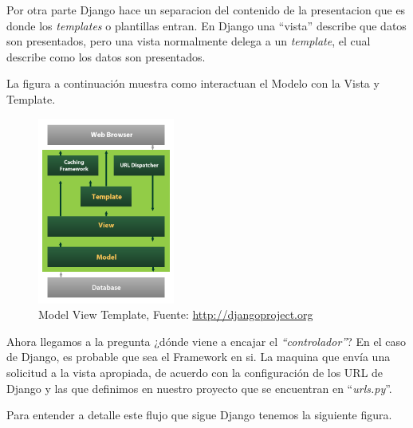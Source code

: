 Por otra parte Django hace un separacion del contenido de la presentacion que es
donde los {\it templates} o plantillas entran. En Django una ``vista'' describe
que datos son presentados, pero una vista normalmente delega a un {\it template},
el cual describe como los datos son presentados.

La figura a continuación muestra como interactuan el Modelo con la Vista y Template.

\begin{figure}[h]
  \begin{center}
    \includegraphics[width=0.4\textwidth]{figures/chapter5/Django_mvc.png}
    \caption[Model Template View - MTV]{Model View Template, Fuente: \url{http://djangoproject.org}}
  \end{center}
\end{figure}

Ahora llegamos a la pregunta ¿dónde viene a encajar el {\it ``controlador''}? En el caso
de Django, es probable que sea el Framework en si. La maquina que envía una
solicitud a la vista apropiada, de acuerdo con la configuración de los URL de Django
y las que definimos en nuestro proyecto que se encuentran en ``{\it urls.py}''.

Para entender a detalle este flujo que sigue Django tenemos la siguiente figura.


